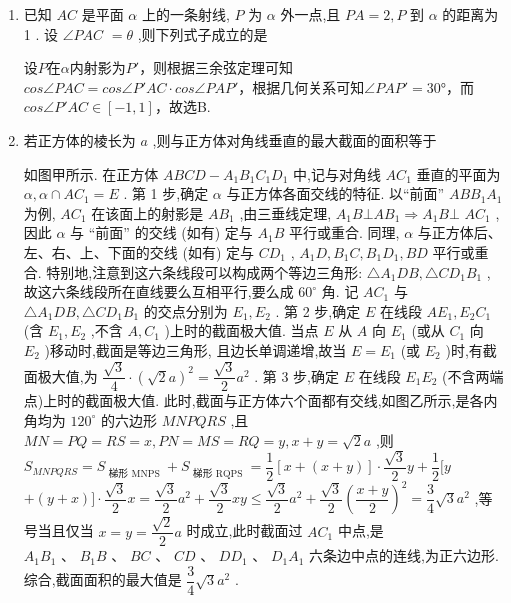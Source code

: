 \begin{enumerate}
    \item 已知 ${AC}$ 是平面 $\alpha$ 上的一条射线, $P$ 为 $\alpha$ 外一点,且 ${PA} = 2,P$ 到 $\alpha$ 的距离为 1 . 设 $\angle {PAC}$  $= \theta$ ,则下列式子成立的是
    \begin{jieda}
        设$P$在$\alpha$内射影为$P'$，则根据三余弦定理可知$cos\angle{PAC} = cos\angle{P'AC} \cdot cos\angle{PAP'}$，根据几何关系可知$\angle{PAP'} = \ang{30}$，而$cos\angle{P'AC} \in [-1, 1]$，故选B.
    \end{jieda}
    \item 若正方体的棱长为 $a$ ,则与正方体对角线垂直的最大截面的面积等于
    \begin{jieda}
        如图甲所示. 在正方体 ${ABCD} - {A}_{1}{B}_{1}{C}_{1}{D}_{1}$ 中,记与对角线 $A{C}_{1}$ 垂直的平面为 $\alpha ,\alpha  \cap  A{C}_{1} = E$ .  第 1 步,确定 $\alpha$ 与正方体各面交线的特征. 以“前面” ${AB}{B}_{1}{A}_{1}$ 为例, $A{C}_{1}$ 在该面上的射影是 $A{B}_{1}$ ,由三垂线定理, ${A}_{1}B \bot  A{B}_{1} \Longrightarrow  {A}_{1}B \bot$  $A{C}_{1}$ ,因此 $\alpha$ 与 “前面” 的交线 (如有) 定与 ${A}_{1}B$ 平行或重合. 同理, $\alpha$ 与正方体后、左、右、上、下面的交线 (如有) 定与 $C{D}_{1}$ , ${A}_{1}D,{B}_{1}C,{B}_{1}{D}_{1},{BD}$ 平行或重合. 特别地,注意到这六条线段可以构成两个等边三角形: $\bigtriangleup {A}_{1}{DB},\bigtriangleup C{D}_{1}{B}_{1}$ ,故这六条线段所在直线要么互相平行,要么成 ${60}^{ \circ  }$ 角. 记 $A{C}_{1}$ 与 $\bigtriangleup {A}_{1}{DB},\bigtriangleup C{D}_{1}{B}_{1}$ 的交点分别为 ${E}_{1},{E}_{2}$ .  第 2 步,确定 $E$ 在线段 $A{E}_{1},{E}_{2}{C}_{1}$ (含 ${E}_{1},{E}_{2}$ ,不含 $A,{C}_{1}$ )上时的截面极大值. 当点 $E$ 从 $A$ 向 ${E}_{1}$ (或从 ${C}_{1}$ 向 ${E}_{2}$ )移动时,截面是等边三角形, 且边长单调递增,故当 $E = {E}_{1}$ (或 ${E}_{2}$ )时,有截面极大值,为 $\dfrac{\sqrt{3}}{4} \cdot  {\left( \sqrt{2}a\right) }^{2} = \dfrac{\sqrt{3}}{2}{a}^{2}$ . 第 3 步,确定 $E$ 在线段 ${E}_{1}{E}_{2}$ (不含两端点)上时的截面极大值. 此时,截面与正方体六个面都有交线,如图乙所示,是各内角均为 ${120}^{ \circ  }$ 的六边形 ${MNPQRS}$ ,且 ${MN} = {PQ} = {RS} = x,{PN} = {MS} = {RQ} = y,x + y = \sqrt{2}a$ ,则 ${S}_{MNPQRS} = {S}_{\text{ 梯形 MNPS }} + {S}_{\text{ 梯形 RQPS }} = \dfrac{1}{2}\left\lbrack  {x + \left( {x + y}\right) }\right\rbrack   \cdot  \dfrac{\sqrt{3}}{2}y + \dfrac{1}{2}\lbrack y$  $+ \left( {y + x}\right) \rbrack  \cdot  \dfrac{\sqrt{3}}{2}x = \dfrac{\sqrt{3}}{2}{a}^{2} + \dfrac{\sqrt{3}}{2}{xy} \leq  \dfrac{\sqrt{3}}{2}{a}^{2} + \dfrac{\sqrt{3}}{2}{\left( \dfrac{x + y}{2}\right) }^{2} = \dfrac{3}{4}\sqrt{3}{a}^{2}$ ,等号当且仅当 $x = y = \dfrac{\sqrt{2}}{2}a$ 时成立,此时截面过 $A{C}_{1}$ 中点,是 ${A}_{1}{B}_{1}\text{ 、 }{B}_{1}B\text{ 、 }{BC}\text{ 、 }{CD}\text{ 、 }D{D}_{1}\text{ 、 }{D}_{1}{A}_{1}$ 六条边中点的连线,为正六边形. 综合,截面面积的最大值是 $\dfrac{3}{4}\sqrt{3}{a}^{2}$ .
        

\end{jieda}
\end{enumerate}
